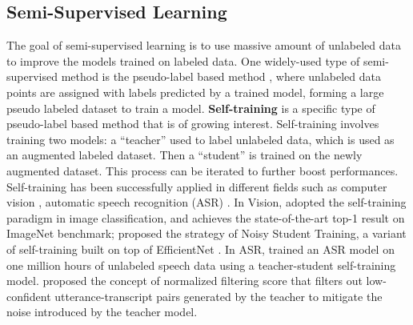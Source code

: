 \documentclass[11pt,a4paper]{article}
\begin{document}
\subsection{Semi-Supervised Learning}
The goal of semi-supervised learning \citep{10.7551/mitpress/9780262033589.001.0001,zhu2005semi} is to use massive
amount of 
 unlabeled data to improve the models trained  on labeled data. 
One widely-used type of semi-supervised method is 
the pseudo-label  based method
 \citep{lee2013pseudo,reed2015training,iscen2019label,Shi_2018_ECCV,arazo2020pseudo}, where unlabeled data points are assigned with labels predicted by a trained model, 
forming a large pseudo labeled dataset to train a model. 
{\bf Self-training} \citep{1053799,riloff2003learning} is a specific type of pseudo-label  based method that is of growing interest. 
Self-training involves training two models: a ``teacher'' used to label unlabeled data, which is  used as an augmented labeled dataset. 
Then  a ``student'' is trained on the newly augmented dataset. 
This process can be iterated to further boost performances. Self-training has been successfully applied in 
different fields such as 
computer vision \citep{yalniz2019billion,babakhin2019semi,xie2020self,chen2020big,zoph2020rethinking}, automatic speech recognition (ASR) \cite{parthasarathi2019lessons}. 
In Vision, \citet{yalniz2019billion} adopted the self-training paradigm in image classification, and achieves the state-of-the-art top-1 result on ImageNet benchmark; \citet{xie2020self} proposed the strategy of Noisy Student Training, a variant of self-training built on top of EfficientNet \citep{tan2020efficientnet}.
In ASR, \citet{parthasarathi2019lessons} trained an ASR model on one million hours of unlabeled speech data  using a teacher-student self-training model.
\citet{park2020improved} proposed the concept of normalized filtering score that filters out low-confident utterance-transcript pairs generated by the teacher to mitigate the noise introduced by the teacher model.


 
 
\end{document}
